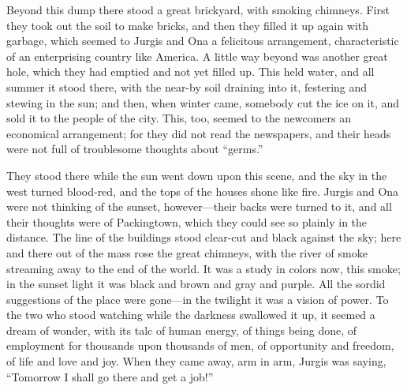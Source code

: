 \documentclass[
]{book}
\begin{document}
Beyond this dump there stood a great brickyard, with smoking chimneys. First they took out the soil to make bricks, and then they filled it up again with garbage, which seemed to Jurgis and Ona a felicitous arrangement, characteristic of an enterprising country like America. A little way beyond was another great hole, which they had emptied and not yet filled up. This held water, and all summer it stood there, with the near-by soil draining into it, festering and stewing in the sun; and then, when winter came, somebody cut the ice on it, and sold it to the people of the city. This, too, seemed to the newcomers an economical arrangement; for they did not read the newspapers, and their heads were not full of troublesome thoughts about ``germs.''

They stood there while the sun went down upon this scene, and the sky in the west turned blood-red, and the tops of the houses shone like fire. Jurgis and Ona were not thinking of the sunset, however---their backs were turned to it, and all their thoughts were of Packingtown, which they could see so plainly in the distance. The line of the buildings stood clear-cut and black against the sky; here and there out of the mass rose the great chimneys, with the river of smoke streaming away to the end of the world. It was a study in colors now, this smoke; in the sunset light it was black and brown and gray and purple. All the sordid suggestions of the place were gone---in the twilight it was a vision of power. To the two who stood watching while the darkness swallowed it up, it seemed a dream of wonder, with its talc of human energy, of things being done, of employment for thousands upon thousands of men, of opportunity and freedom, of life and love and joy. When they came away, arm in arm, Jurgis was saying, ``Tomorrow I shall go there and get a job!''

  
\end{document}

